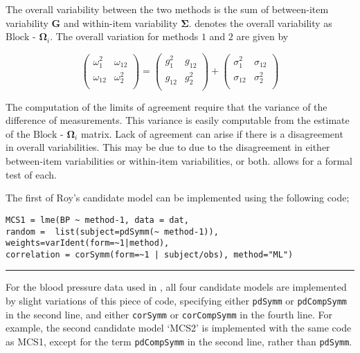 \documentclass[12pt, a4paper]{report}
\theoremstyle{plain}
\theoremstyle{definition}
\theoremstyle{remark}
\begin{document}
	
	
	
	The overall variability between
	the two methods is the sum of between-item variability
	$\boldsymbol{G}$ and within-item variability
	$\boldsymbol{\Sigma}$. \citet{ARoy2009} denotes the overall variability
	as ${\mbox{Block - }\boldsymbol \Omega_{i}}$. The overall
	variation for methods $1$ and $2$ are given by
	
	\begin{center}
		\[\left(\begin{array}{cc}
		\omega^2_1  & \omega_{12} \\
		\omega_{12} & \omega^2_2 \\
		\end{array}  \right)
		=  \left(
		\begin{array}{cc}
		g^2_1  & g_{12} \\
		g_{12} & g^2_2 \\
		\end{array} \right)+
		\left(
		\begin{array}{cc}
		\sigma^2_1  & \sigma_{12} \\
		\sigma_{12} & \sigma^2_2 \\
		\end{array}\right)
		\]
	\end{center}
	The computation of the limits of agreement require that the variance of the difference of measurements. This variance is easily computable from the estimate of the ${\mbox{Block - }\boldsymbol \Omega_{i}}$ matrix. Lack of agreement can arise if there is a disagreement in overall variabilities. This may be due to due to the disagreement in either between-item
	variabilities or within-item variabilities, or both. \citet{ARoy2009} allows for a formal test of each.
	

The first of Roy's candidate model can be implemented using the following code;\\

\begin{verbatim}
MCS1 = lme(BP ~ method-1, data = dat,
random =  list(subject=pdSymm(~ method-1)),
weights=varIdent(form=~1|method),
correlation = corSymm(form=~1 | subject/obs), method="ML")
\end{verbatim}
\hrule
\vspace{1cm}
For the blood pressure data used in \citet{ARoy2009}, all four candidate models are implemented by slight variations of this piece of code, specifying either \texttt{pdSymm} or \texttt{pdCompSymm} in the second line, and either \texttt{corSymm} or \texttt{corCompSymm} in the fourth line.
For example, the second candidate model `MCS2' is implemented with the same code as MCS1, except for the term \texttt{pdCompSymm} in the second line, rather than \texttt{pdSymm}.
\end{document}
